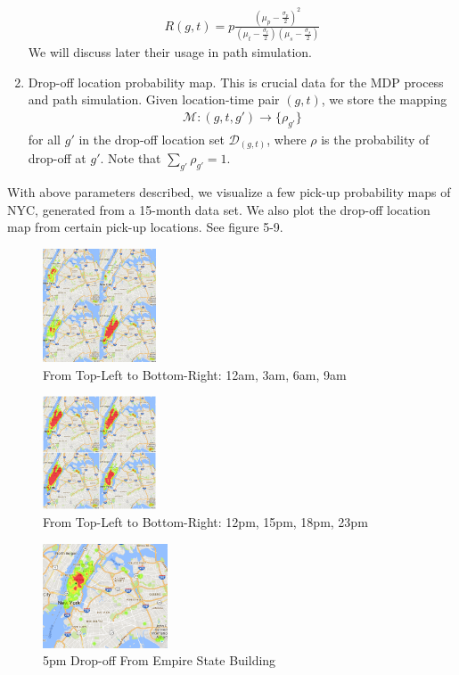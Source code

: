 \documentclass[letterpaper, 10 pt, conference]{ieeeconf}
\begin{document}
\begin{enumerate}
\begin{align}
R(g, t) = p\frac{(\mu_p-\frac{\sigma_p}{2})^2}{(\mu_t-\frac{\sigma_t}{2})(\mu_s-\frac{\sigma_s}{2})}
\end{align}
We will discuss later their usage in path simulation. 
\item Drop-off location probability map. This is crucial data for the MDP process and path simulation. Given location-time pair $(g, t)$, we store the mapping 
\begin{align}
\mathcal{M}:(g,t,g')\to \{\rho_{g'}\}
\end{align}
for all $g'$ in the drop-off location set $\mathcal{D}_{(g,t)}$, where $\rho$ is the probability of drop-off at $g'$. Note that $\sum_{g'}\rho_{g'}=1$.
\end{enumerate}
With above parameters described, we visualize a few pick-up probability maps of NYC, generated from a 15-month data set. We also plot the drop-off location map from certain pick-up locations. See figure 5-9.
\begin{figure}
\centering
\includegraphics[width=0.3\textwidth]{0-9.jpg}
\caption{From Top-Left to Bottom-Right: 12am, 3am, 6am, 9am}
\end{figure}
\begin{figure}
\centering
\includegraphics[width=0.3\textwidth]{12-23.jpg}
\caption{From Top-Left to Bottom-Right: 12pm, 15pm, 18pm, 23pm}
\end{figure}
\begin{figure}
\centering
\includegraphics[width=0.33\textwidth]{5pm-empire-state.png}
\caption{5pm Drop-off From Empire State Building}
\end{figure}
\end{document}
